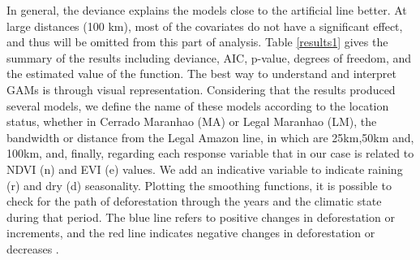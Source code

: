 In general, the deviance explains the models close to the artificial line better. At large distances (100 km), most of the covariates do not have a significant effect, and thus will be omitted from this part of analysis. Table \ref{results1} gives the summary of the results including deviance, AIC, p-value, degrees of freedom, and the estimated value of the function. The best way to understand and interpret GAMs is through visual representation. Considering that the results produced several models, we define the name of these models according to the location status, whether in Cerrado Maranhao (MA) or Legal Maranhao (LM), the bandwidth or distance from the Legal Amazon line, in which are 25km,50km and, 100km, and, finally, regarding each response variable that in our case is related to NDVI (n) and EVI (e) values. We add an indicative variable to indicate raining (r) and dry (d) seasonality. Plotting the smoothing functions, it is possible to check for the path of deforestation through the years and the climatic state during that period. The blue line refers to positive changes in deforestation or increments, and the red line indicates negative changes in deforestation or decreases \citep{Gavin_2018}. 

